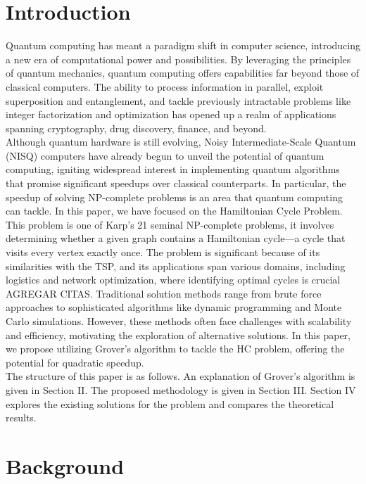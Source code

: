\documentclass[10pt,a4paper]{article}
\begin{document}
\section{Introduction}

Quantum computing has meant a paradigm shift in computer science, introducing a new era of computational power and possibilities. By leveraging the principles of quantum mechanics, quantum computing offers capabilities far beyond those of classical computers. The ability to process information in parallel, exploit superposition and entanglement, and tackle previously intractable problems like integer factorization and optimization has opened up a realm of applications spanning cryptography, drug discovery, finance, and beyond.\\
Although quantum hardware is still evolving, Noisy Intermediate-Scale Quantum (NISQ) \cite{Preskill} computers have already begun to unveil the potential of quantum computing, igniting widespread interest in implementing quantum algorithms that promise significant speedups over classical counterparts. In particular, the speedup of solving NP-complete problems is an area that quantum computing can tackle. In this paper, we have focused on the Hamiltonian Cycle Problem.\\
This problem is one of Karp's 21 seminal NP-complete problems, it involves determining whether a given graph contains a Hamiltonian cycle—a cycle that visits every vertex exactly once. The problem is significant because of its similarities with the TSP, and its applications span various domains, including logistics and network optimization, where identifying optimal cycles is crucial AGREGAR CITAS. Traditional solution methods range from brute force approaches to sophisticated algorithms like dynamic programming and Monte Carlo simulations. However, these methods often face challenges with scalability and efficiency, motivating the exploration of alternative solutions. In this paper, we propose utilizing Grover's algorithm to tackle the HC problem, offering the potential for quadratic speedup.\\
The structure of this paper is as follows. An explanation of Grover's algorithm is given in Section II. The proposed methodology is given in Section III. Section IV explores the existing solutions for the problem and compares the theoretical results.


\section{Background}
\end{document}

